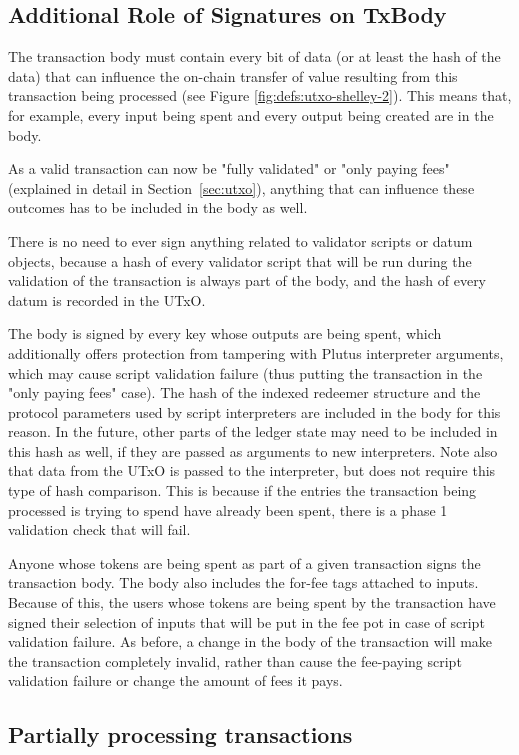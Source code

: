 \subsection{Additional Role of Signatures on TxBody}
The transaction body must contain every bit of data
(or at least the hash of the data) that can influence the
on-chain transfer of value resulting from this transaction being processed
(see Figure \ref{fig:defs:utxo-shelley-2}).
This means that, for example,
every input being spent and every output being created are in the body.

As a valid transaction can now be "fully validated" or "only paying
fees" (explained in detail in Section~\ref{sec:utxo}), anything that
can influence these outcomes has to be included in the body as well.

There is no need to ever sign anything related to validator scripts or datum objects,
because a hash of every validator script that will be run during the validation
of the transaction is always part of the body, and the hash of every datum
is recorded in the UTxO.

The body is signed by every key
whose outputs are being spent, which additionally offers
protection from tampering with Plutus interpreter arguments, which may cause
script validation failure (thus putting the transaction in the "only paying fees" case).
The hash of the indexed redeemer structure and the protocol parameters used by
script interpreters are included in the body for this reason. In the future, other parts of the ledger
state may need to be included in this hash as well, if they are passed as
arguments to new interpreters. Note also that data from the UTxO
is passed to the interpreter, but does not require this type of hash comparison.
This is because if the entries the transaction being processed is trying to
spend have already been spent, there is a phase 1 validation check that
will fail.

Anyone whose tokens are being spent as part of a given transaction
signs the transaction body. The body also includes the for-fee tags attached to inputs.
Because of this, the users whose tokens are being spent by the transaction have
signed their selection of
inputs that will be put in the fee pot in case of script validation failure.
As before, a change in the body of the transaction
will make the transaction completely invalid, rather than cause the fee-paying script validation
failure or change the amount of fees it pays.

\subsection{Partially processing transactions}

